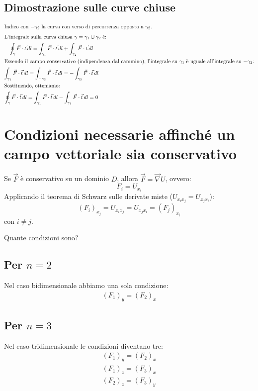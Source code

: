 \subsection{Dimostrazione sulle curve chiuse}
\begin{gather}
\intertext{Indico con $-\gamma_2$ la curva con verso di percorrenza opposto a $\gamma_2$.}
\intertext{L'integrale sulla curva chiusa $\gamma = \gamma_1 \cup \gamma_2$ è:}
\oint_{\gamma} \vec{F} \cdot \vec{t} \, dl = \int_{\gamma_1} \vec{F} \cdot \vec{t} \, dl + \int_{\gamma_2} \vec{F} \cdot \vec{t} \, dl \\
\intertext{Essendo il campo conservativo (indipendenza dal cammino), l'integrale su $\gamma_1$ è uguale all'integrale su $-\gamma_2$:}
\int_{\gamma_1} \vec{F} \cdot \vec{t} \, dl = \int_{-\gamma_2} \vec{F} \cdot \vec{t} \, dl = -\int_{\gamma_2} \vec{F} \cdot \vec{t} \, dl \\
\intertext{Sostituendo, otteniamo:}
\oint_{\gamma} \vec{F} \cdot \vec{t} \, dl = \int_{\gamma_1} \vec{F} \cdot \vec{t} \, dl - \int_{\gamma_1} \vec{F} \cdot \vec{t} \, dl = 0
\end{gather}\section{Condizioni necessarie affinché un campo vettoriale sia conservativo}
Se $\vec{F}$ è conservativo su un dominio $D$, allora $\vec{F} = \vec{\nabla}U$, ovvero:
$$F_i = U_{x_i}$$
Applicando il teorema di Schwarz sulle derivate miste ($U_{x_i x_j} = U_{x_j x_i}$):
$$(F_i)_{x_j} = U_{x_i x_j} = U_{x_j x_i} = (F_j)_{x_i}$$
con $i \neq j$.

Quante condizioni sono?
\subsection{Per $n=2$}
Nel caso bidimensionale abbiamo una sola condizione:
\begin{gather*}
(F_1)_y = (F_2)_x
\end{gather*}

\subsection{Per $n=3$}
Nel caso tridimensionale le condizioni diventano tre:
\begin{gather*}
(F_1)_y = (F_2)_x \\
(F_1)_z = (F_3)_x \\
(F_2)_z = (F_3)_y
\end{gather*}

